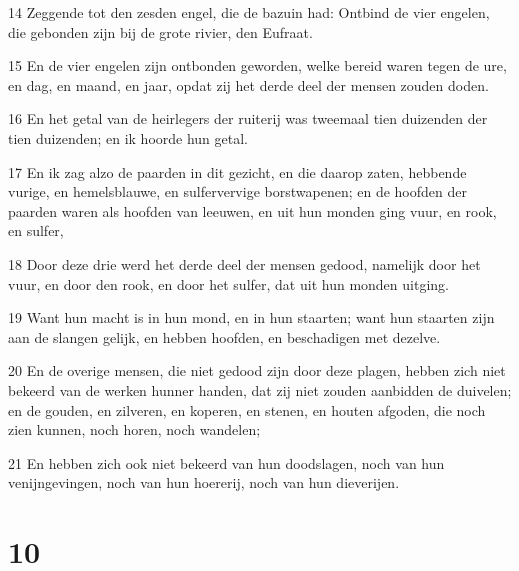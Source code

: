 \par 14 Zeggende tot den zesden engel, die de bazuin had: Ontbind de vier engelen, die gebonden zijn bij de grote rivier, den Eufraat.
\par 15 En de vier engelen zijn ontbonden geworden, welke bereid waren tegen de ure, en dag, en maand, en jaar, opdat zij het derde deel der mensen zouden doden.
\par 16 En het getal van de heirlegers der ruiterij was tweemaal tien duizenden der tien duizenden; en ik hoorde hun getal.
\par 17 En ik zag alzo de paarden in dit gezicht, en die daarop zaten, hebbende vurige, en hemelsblauwe, en sulfervervige borstwapenen; en de hoofden der paarden waren als hoofden van leeuwen, en uit hun monden ging vuur, en rook, en sulfer,
\par 18 Door deze drie werd het derde deel der mensen gedood, namelijk door het vuur, en door den rook, en door het sulfer, dat uit hun monden uitging.
\par 19 Want hun macht is in hun mond, en in hun staarten; want hun staarten zijn aan de slangen gelijk, en hebben hoofden, en beschadigen met dezelve.
\par 20 En de overige mensen, die niet gedood zijn door deze plagen, hebben zich niet bekeerd van de werken hunner handen, dat zij niet zouden aanbidden de duivelen; en de gouden, en zilveren, en koperen, en stenen, en houten afgoden, die noch zien kunnen, noch horen, noch wandelen;
\par 21 En hebben zich ook niet bekeerd van hun doodslagen, noch van hun venijngevingen, noch van hun hoererij, noch van hun dieverijen.

\chapter{10}

